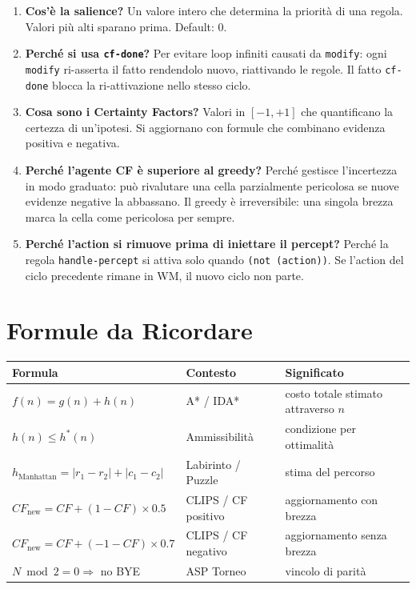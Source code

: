 \documentclass[12pt,a4paper]{article}
\begin{document}
\begin{enumerate}
  \item \textbf{Cos'è la salience?}
        Un valore intero che determina la priorità di una regola. Valori più alti
        sparano prima. Default: 0.

  \item \textbf{Perché si usa \texttt{cf-done}?}
        Per evitare loop infiniti causati da \texttt{modify}: ogni \texttt{modify}
        ri-asserta il fatto rendendolo nuovo, riattivando le regole. Il fatto
        \texttt{cf-done} blocca la ri-attivazione nello stesso ciclo.

  \item \textbf{Cosa sono i Certainty Factors?}
        Valori in $[-1, +1]$ che quantificano la certezza di un'ipotesi.
        Si aggiornano con formule che combinano evidenza positiva e negativa.

  \item \textbf{Perché l'agente CF è superiore al greedy?}
        Perché gestisce l'incertezza in modo graduato: può rivalutare una cella
        parzialmente pericolosa se nuove evidenze negative la abbassano.
        Il greedy è irreversibile: una singola brezza marca la cella come
        pericolosa per sempre.

  \item \textbf{Perché l'action si rimuove prima di iniettare il percept?}
        Perché la regola \texttt{handle-percept} si attiva solo quando
        \texttt{(not (action))}. Se l'action del ciclo precedente rimane
        in WM, il nuovo ciclo non parte.
\end{enumerate}

\section{Formule da Ricordare}

\begin{center}
\renewcommand{\arraystretch}{1.6}
\begin{tabular}{lll}
\toprule
\textbf{Formula} & \textbf{Contesto} & \textbf{Significato} \\
\midrule
$f(n) = g(n) + h(n)$ & A* / IDA* & costo totale stimato attraverso $n$ \\
$h(n) \le h^*(n)$ & Ammissibilità & condizione per ottimalità \\
$h_{\text{Manhattan}} = |r_1-r_2| + |c_1-c_2|$ & Labirinto / Puzzle & stima del percorso \\
$CF_{\text{new}} = CF + (1-CF) \times 0.5$ & CLIPS / CF positivo & aggiornamento con brezza \\
$CF_{\text{new}} = CF + (-1-CF) \times 0.7$ & CLIPS / CF negativo & aggiornamento senza brezza \\
$N \bmod 2 = 0 \Rightarrow$ no BYE & ASP Torneo & vincolo di parità \\
\bottomrule
\end{tabular}
\end{center}
\end{document}
